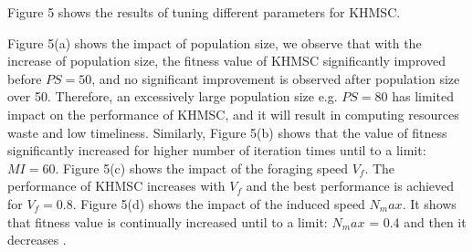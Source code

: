 \documentclass[10pt,journal,compsoc]{IEEEtran}
\begin{document}
Figure 5 shows the results of tuning different parameters for KHMSC. 

Figure 5(a) shows the impact of population size, we observe that with the increase of population size, the fitness value of KHMSC significantly improved before $PS=50$, and no significant improvement is observed after population size over 50. Therefore, an excessively large population size e.g. $PS=80$ has limited impact on the performance of KHMSC, and it will result in computing resources waste and low timeliness.
Similarly, Figure 5(b) shows that the value of fitness significantly increased for higher number of iteration times until to a limit: $MI = 60$. Figure 5(c) shows the impact of the foraging speed $V_f$. The performance of KHMSC increases with $V_f$ and the best performance is achieved for $V_f = 0.8$. Figure 5(d) shows the impact of the induced speed $N_max$. It shows that fitness value is continually increased until to a limit: $N_max$ = 0.4 and then it decreases . 
\end{document}
